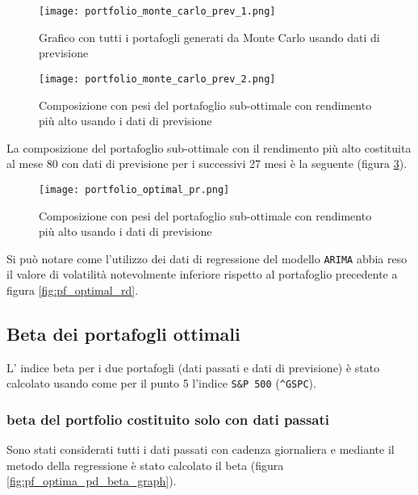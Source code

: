 \begin{figure}[p]
    \centering
    \texttt{[image: portfolio\_monte\_carlo\_prev\_1.png]}
    \caption{Grafico con tutti i portafogli generati da Monte Carlo usando dati di previsione}
    \label{fig:prev_monte_carlo_1}
\end{figure}

\begin{figure}[p]
    \centering
    \texttt{[image: portfolio\_monte\_carlo\_prev\_2.png]}
    \caption{Composizione con pesi del portafoglio sub-ottimale con rendimento più alto usando i dati di previsione}
    \label{fig:prev_monte_carlo_2}
\end{figure}

\pagebreak

La composizione del portafoglio sub-ottimale con il rendimento più alto costituita al mese 80 con dati di previsione per
i successivi 27 mesi è la seguente (figura \ref{fig:pf_optimal_pr}).

\begin{figure}[ht]
    \centering
    \texttt{[image: portfolio\_optimal\_pr.png]}
    \caption{Composizione con pesi del portafoglio sub-ottimale con rendimento più alto usando i dati di previsione}
    \label{fig:pf_optimal_pr}
\end{figure}

Si può notare come l'utilizzo dei dati di regressione del modello \verb|ARIMA| abbia reso il valore di volatilità
notevolmente inferiore rispetto al portafoglio precedente a figura \ref{fig:pf_optimal_rd}.

\subsection{Beta dei portafogli ottimali}

L' indice beta per i due portafogli (dati passati e dati di previsione) è stato calcolato usando come per il punto 5 l'indice
\verb|S&P 500| (\verb|^GSPC|).

\subsubsection{beta del portfolio costituito solo con dati passati}

Sono stati considerati tutti i dati passati con cadenza giornaliera e mediante il metodo della regressione è stato calcolato il beta (figura \ref{fig:pf_optima_pd_beta_graph}).

